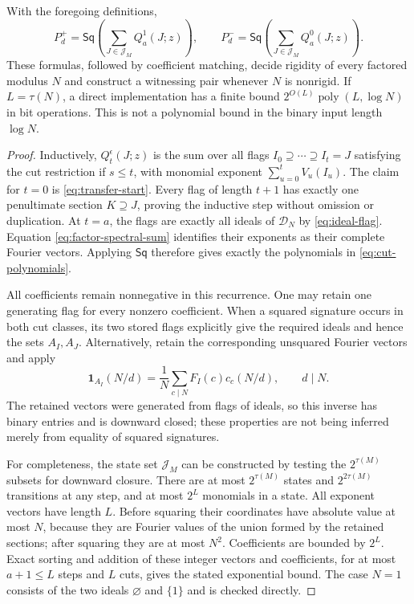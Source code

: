 \begin{proposition}
\label{prop:cut-transfer}
With the foregoing definitions,
\[
 P_d^+=\mathsf{Sq}\left(\sum_{J\in\mathcal J_M}Q_a^1(J;z)\right),
 \qquad
 P_d^-=\mathsf{Sq}\left(\sum_{J\in\mathcal J_M}Q_a^0(J;z)\right).
\]
These formulas, followed by coefficient matching, decide rigidity of every
factored modulus $N$ and construct a witnessing pair whenever $N$ is
nonrigid.  If $L=\tau(N)$, a direct implementation has a finite bound
$2^{O(L)}\operatorname{poly}(L,\log N)$ in bit operations.  This is not a
polynomial bound in the binary input length $\log N$.
\end{proposition}
\begin{proof}
Inductively, $Q_t^{\epsilon}(J;z)$ is the sum over all flags
$I_0\supseteq\cdots\supseteq I_t=J$ satisfying the cut restriction if
$s\le t$, with monomial exponent $\sum_{u=0}^t V_u(I_u)$.
The claim for $t=0$ is \eqref{eq:transfer-start}.  Every flag of length
$t+1$ has exactly one penultimate section $K\supseteq J$, proving the
inductive step without omission or duplication.  At $t=a$, the flags
are exactly all ideals of $\mathcal D_N$ by \eqref{eq:ideal-flag}.
Equation \eqref{eq:factor-spectral-sum} identifies their exponents as
their complete Fourier vectors.  Applying $\mathsf{Sq}$ therefore gives
exactly the polynomials in \eqref{eq:cut-polynomials}.

All coefficients remain nonnegative in this recurrence.  One may retain
one generating flag for every nonzero coefficient.  When a squared
signature occurs in both cut classes, its two stored flags explicitly
give the required ideals and hence the sets $A_I,A_J$.  Alternatively,
retain the corresponding unsquared Fourier vectors and apply
\[
 \mathbf1_{A_I}(N/d)=\frac1N\sum_{c\mid N}F_I(c)c_c(N/d),\qquad d\mid N.
\]
The retained vectors were generated from flags of ideals, so this inverse
has binary entries and is downward closed; these properties are not being
inferred merely from equality of squared signatures.

For completeness, the state set $\mathcal J_M$ can be constructed by
testing the $2^{\tau(M)}$ subsets for downward closure.  There are at most
$2^{\tau(M)}$ states and $2^{2\tau(M)}$ transitions at any step, and
at most $2^L$ monomials in a state.  All exponent vectors have length
$L$.  Before squaring their coordinates have absolute value at most $N$,
because they are Fourier values of the union formed by the retained
sections; after squaring they are at most $N^2$.  Coefficients are bounded
by $2^L$.  Exact sorting and addition of these integer vectors and
coefficients, for at most $a+1\le L$ steps and $L$ cuts, gives the stated
exponential bound.  The case $N=1$ consists of the two ideals
$\varnothing$ and $\{1\}$ and is checked directly.
\end{proof}

